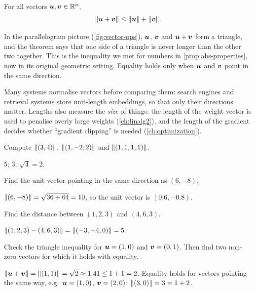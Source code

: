 \begin{theorem}\label{thm:triangle-inequality}
For all vectors $\bm{u}, \bm{v} \in \mathbb{R}^n$,
\[
  \lVert\bm{u} + \bm{v}\rVert \le \lVert\bm{u}\rVert + \lVert\bm{v}\rVert .
\]
\end{theorem}

In the parallelogram picture (\cref{fig:vector-ops}), $\bm{u}$, $\bm{v}$ and
$\bm{u} + \bm{v}$ form a triangle, and the theorem says that one side of a triangle
is never longer than the other two together. This is the inequality we met
for numbers in \cref{prop:abs-properties}, now in its original geometric
setting. Equality holds only when $\bm{u}$ and $\bm{v}$ point in the same direction.

\begin{mlnote}
Many systems normalise vectors before comparing them: search engines and
retrieval systems store unit-length embeddings, so that only their directions
matter. Lengths also measure the \emph{size} of things: the length of the
weight vector is used to penalise overly large weights
(\cref{ch:linalg2}), and the length of the gradient decides whether
``gradient clipping'' is needed (\cref{ch:optimization}).
\end{mlnote}

\sectionexercises

\begin{exercise}
Compute $\lVert(3, 4)\rVert$, $\lVert(1, -2, 2)\rVert$ and $\lVert(1, 1, 1, 1)\rVert$.
\end{exercise}
\begin{solution}
$5$; $3$; $\sqrt{4} = 2$.
\end{solution}

\begin{exercise}
Find the unit vector pointing in the same direction as $(6, -8)$.
\end{exercise}
\begin{solution}
$\lVert(6,-8)\rVert = \sqrt{36 + 64} = 10$, so the unit vector is $(0.6, -0.8)$.
\end{solution}

\begin{exercise}
Find the distance between $(1, 2, 3)$ and $(4, 6, 3)$.
\end{exercise}
\begin{solution}
$\lVert(1,2,3) - (4,6,3)\rVert = \lVert(-3, -4, 0)\rVert = 5$.
\end{solution}

\begin{exercise}
Check the triangle inequality for $\bm{u} = (1, 0)$ and $\bm{v} = (0, 1)$. Then find
two non-zero vectors for which it holds with equality.
\end{exercise}
\begin{solution}
$\lVert\bm{u} + \bm{v}\rVert = \lVert(1,1)\rVert = \sqrt2 \approx 1.41 \le 1 + 1 = 2$. Equality
holds for vectors pointing the same way, e.g.\ $\bm{u} = (1, 0)$, $\bm{v} = (2, 0)$:
$\lVert(3, 0)\rVert = 3 = 1 + 2$.
\end{solution}

